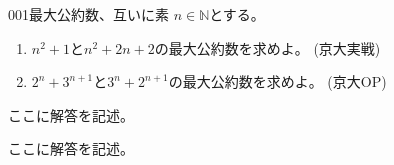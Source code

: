 \begin{prob}{001}{}{最大公約数、互いに素}
 $n\in \mathbb{N}$とする。
 \begin{enumerate}
  \item $n^2+1$と$n^2+2n+2$の最大公約数を求めよ。  (京大実戦)
  \item $2^n+3^{n+1}$と$3^n+2^{n+1}$の最大公約数を求めよ。  (京大OP)
 \end{enumerate}
\end{prob}
ここに解答を記述。

ここに解答を記述。
